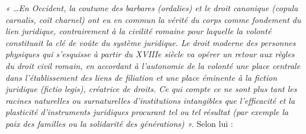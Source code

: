  \emph{« …En Occident, la coutume des barbares (ordalies) et le droit canonique (copula carnalis, coït charnel) ont eu en commun la vérité du corps comme fondement du lien juridique, contrairement à la civilité romaine pour laquelle la volonté constituait la clé de voûte du système juridique. Le droit moderne des personnes physiques qui s'esquisse à partir du XVIIIe siècle va opérer un retour aux règles du droit civil romain, en accordant à l'autonomie de la volonté une place centrale dans l'établissement des liens de filiation et une place éminente à la fiction juridique (fictio legis), créatrice de droits.}
 \emph{Ce qui compte ce ne sont plus tant les racines naturelles ou surnaturelles d'institutions intangibles que l'efficacité et la plasticité d'instruments juridiques procurant tel ou tel résultat (par exemple la paix des familles ou la solidarité des générations) ».}
 Selon lui :

